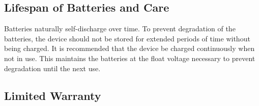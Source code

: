 \documentclass[../jb_user_manual.tex]{subfiles}
\begin{document}
\subsection{\Large{Lifespan of Batteries and Care}}

Batteries naturally self-discharge over time.  To prevent degradation of the batteries, the device should not be stored for extended periods of time without being charged.  It is recommended that the device be charged continuously when not in use.  This maintains the batteries at the float voltage necessary to prevent degradation until the next use.

\subsection{\Large{Limited Warranty}}
\blindtext
\end{document}
